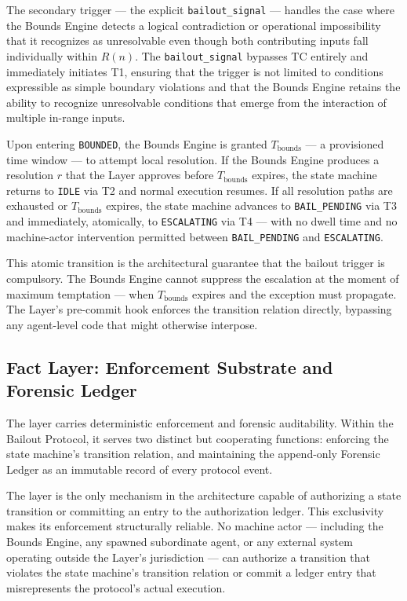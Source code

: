 The secondary trigger — the explicit \texttt{bailout\_signal} — handles the case where the Bounds Engine detects a logical contradiction or operational impossibility that it recognizes as unresolvable even though both contributing inputs fall individually within $R(n)$. The \texttt{bailout\_signal} bypasses TC entirely and immediately initiates T1, ensuring that the trigger is not limited to conditions expressible as simple boundary violations and that the Bounds Engine retains the ability to recognize unresolvable conditions that emerge from the interaction of multiple in-range inputs.

Upon entering \texttt{BOUNDED}, the Bounds Engine is granted $T_{\text{bounds}}$ — a provisioned time window — to attempt local resolution. If the Bounds Engine produces a resolution $r$ that the \fact{} Layer approves before $T_{\text{bounds}}$ expires, the state machine returns to \texttt{IDLE} via T2 and normal execution resumes. If all resolution paths are exhausted or $T_{\text{bounds}}$ expires, the state machine advances to \texttt{BAIL\_PENDING} via T3 and immediately, atomically, to \texttt{ESCALATING} via T4 — with no dwell time and no machine-actor intervention permitted between \texttt{BAIL\_PENDING} and \texttt{ESCALATING}.

This atomic transition is the architectural guarantee that the bailout trigger is compulsory. The Bounds Engine cannot suppress the escalation at the moment of maximum temptation — when $T_{\text{bounds}}$ expires and the exception must propagate. The \fact{} Layer's pre-commit hook enforces the transition relation directly, bypassing any agent-level code that might otherwise interpose.

\subsection{Fact Layer: Enforcement Substrate and Forensic Ledger}
\label{sec:fact-layer}

The \fact{} layer carries deterministic enforcement and forensic auditability. Within the Bailout Protocol, it serves two distinct but cooperating functions: enforcing the state machine's transition relation, and maintaining the append-only Forensic Ledger as an immutable record of every protocol event.

The \fact{} layer is the only mechanism in the \bxthree{} architecture capable of authorizing a state transition or committing an entry to the authorization ledger. This exclusivity makes its enforcement structurally reliable. No machine actor — including the Bounds Engine, any spawned subordinate agent, or any external system operating outside the \fact{} Layer's jurisdiction — can authorize a transition that violates the state machine's transition relation or commit a ledger entry that misrepresents the protocol's actual execution.

